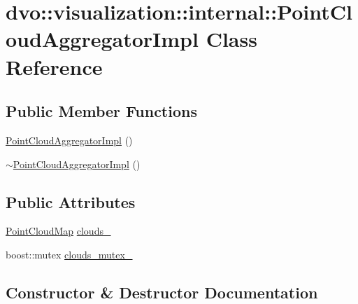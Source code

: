 \hypertarget{classdvo_1_1visualization_1_1internal_1_1_point_cloud_aggregator_impl}{}\section{dvo\+:\+:visualization\+:\+:internal\+:\+:Point\+Cloud\+Aggregator\+Impl Class Reference}
\label{classdvo_1_1visualization_1_1internal_1_1_point_cloud_aggregator_impl}
\subsection*{Public Member Functions}
\begin{DoxyCompactItemize}
\item 
\mbox{\hyperlink{classdvo_1_1visualization_1_1internal_1_1_point_cloud_aggregator_impl_a6d3ae4b9c5a446fa954e159a2768d231}{Point\+Cloud\+Aggregator\+Impl}} ()
\item 
\mbox{\hyperlink{classdvo_1_1visualization_1_1internal_1_1_point_cloud_aggregator_impl_a4c02fb3f527603af8bb1bedb7ae45ea9}{$\sim$\+Point\+Cloud\+Aggregator\+Impl}} ()
\end{DoxyCompactItemize}
\subsection*{Public Attributes}
\begin{DoxyCompactItemize}
\item 
\mbox{\hyperlink{namespacedvo_1_1visualization_a6bfc209b639de1fc1fb54582af7292f7}{Point\+Cloud\+Map}} \mbox{\hyperlink{classdvo_1_1visualization_1_1internal_1_1_point_cloud_aggregator_impl_a0ea4be19b451e1d10c5d2b14c02e11e9}{clouds\+\_\+}}
\item 
boost\+::mutex \mbox{\hyperlink{classdvo_1_1visualization_1_1internal_1_1_point_cloud_aggregator_impl_a1b959ce567fa43e695eab5c33b56ab4f}{clouds\+\_\+mutex\+\_\+}}
\end{DoxyCompactItemize}


\subsection{Constructor \& Destructor Documentation}
\mbox{\label{classdvo_1_1visualization_1_1internal_1_1_point_cloud_aggregator_impl_a6d3ae4b9c5a446fa954e159a2768d231}} 

